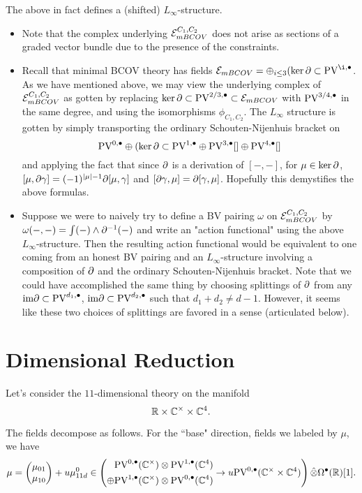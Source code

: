 \documentclass[11pt]{article}
\begin{document}
\begin{prop}
The above in fact defines a (shifted) $L_\infty$-structure.
\end{prop}

\begin{rmk}
\begin{itemize}
\item Note that the complex underlying $\mathcal{E}_{mBCOV}^{C_1,C_2}$ does not arise as sections of a graded vector bundle due to the presence of the constraints.
\item Recall that minimal BCOV theory has fields $\mc E_{mBCOV}=\oplus_{i\leq 3} (\ker\del\subset\PV^{\i,\bullet}$. As we have mentioned above, we may view the underlying complex of $\mathcal{E}_{mBCOV}^{C_1,C_2}$ as gotten by replacing $\ker\partial\subset\text{PV}^{2/3,\bullet}\subset\mathcal{E}_{mBCOV}$ with $\text{PV}^{3/4,\bullet}$ in the same degree, and using the isomorphisms $\phi_{C_1,C_2}$. The $L_\infty$ structure is gotten by simply transporting the ordinary Schouten-Nijenhuis bracket on \[\text{PV}^{0,\bullet}\oplus(\ker\partial\subset\text{PV}^{1,\bullet}\oplus\text{PV}^{3,\bullet}[]\oplus\text{PV}^{4,\bullet}[]\] and applying the fact that since $\partial$ is a derivation of $[-,-]$, for $\mu\in\ker\partial$, $[\mu,\partial\gamma]=(-1)^{|\mu|-1}\partial[\mu,\gamma]$ and $[\partial\gamma,\mu]=\partial[\gamma,\mu]$. Hopefully this demystifies the above formulas.
\item Suppose we were to naively try to define a BV pairing $\omega$ on $\mathcal{E}_{mBCOV}^{C_1,C_2}$ by $\omega(-,-)=\int (-)\wedge\partial^{-1}(-)$ and write an "action functional" using the above $L_\infty$-structure. Then the resulting action functional would be equivalent to one coming from an honest BV pairing and an $L_\infty$-structure involving a composition of $\partial$ and the ordinary Schouten-Nijenhuis bracket. Note that we could have accomplished the same thing by choosing splittings of $\partial$ from any $\text{im}\partial\subset \text{PV}^{d_1,\bullet}$, $\text{im}\partial\subset\text{PV}^{d_2,\bullet}$ such that $d_1+d_2\neq d-1$. However, it seems like these two choices of splittings are favored in a sense (articulated below). 
\end{itemize}
\end{rmk}
\fi

\section{Dimensional Reduction}
Let's consider the $11$-dimensional theory on the manifold
\[
\mathbb{R}\times\mathbb{C}^\times\times\mathbb{C}^4 .
\]

The fields decompose as follows.
For the ``base" direction, fields we labeled by $\mu$, we have
\[
\mu = \begin{pmatrix} \mu_{01} \\ \mu_{10} \end{pmatrix} + u \mu_{11d}^0 \in \left (\begin{aligned} & \text{PV}^{0,\bullet}(\mathbb{C}^\times)\otimes\text{PV}^{1,\bullet}(\mathbb{C}^4) \\ \oplus & \text{PV}^{1,\bullet}(\mathbb{C}^\times)\otimes\text{PV}^{0,\bullet}(\mathbb{C}^4)\end{aligned} \to u \text{PV}^{0,\bullet}(\mathbb{C}^\times\times\mathbb{C}^4)\right ) \Hat{\otimes} \Omega^\bullet(\mathbb{R}) [1] .
\]
\end{document}
